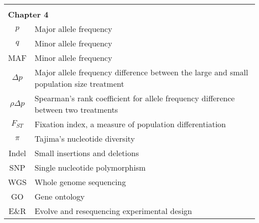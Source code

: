 \begin{table}[htp]
\begin{center}
\begin{tabular}{cl}
&\\
\multicolumn{2}{l}{\textbf{Chapter 4}}\\
\midrule
$p$ & Major allele frequency\\
$q$ & Minor allele frequency \\
MAF & Minor allele frequency \\
$\Delta p$ & Major allele frequency difference between the large and small population size treatment \\
$\rho\Delta p$ & Spearman's rank coefficient for allele frequency difference between two treatments \\
$F_{ST}$ & Fixation index, a measure of population differentiation\\
$\pi$ & Tajima’s nucleotide diversity \\
Indel & Small insertions and deletions\\
SNP & Single nucleotide polymorphism \\
WGS & Whole genome sequencing \\
GO & Gene ontology\\ 
E\&R & Evolve and resequencing experimental design \\
\end{tabular}
\end{center}
\end{table}
